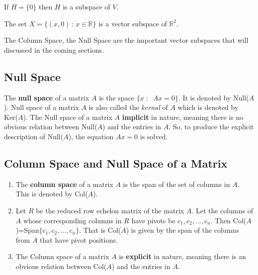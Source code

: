 \documentclass[aima104_lecturenotes_ku.tex]{subfiles}
\begin{document}
\begin{example}
  If $H = \{0\}$ then $H$ is a subspace of $V$.
\end{example}

\begin{example}
  The set $X=\{(x, 0)\, : \, x \in \mathbb{R} \}$ is a vector subspace of $\mathbb{R}^2$.
\end{example}
\begin{example}
  The Column Space, the Null Space are the important vector subspaces that will discussed in the coming sections.
\end{example}

\subsection{Null Space}
The \textbf{null space} of a matrix $A$ is the space $\{x\; : \;\; Ax=0\}$. It is denoted by Null($A$). Null space of a matrix $A$ is also called the \textit{kernal} of $A$ which is denoted by Ker($A$). The Null space of a matrix $A$ \textbf{implicit} in nature, meaning there is no obvious relation between Null($A$) and the entries in $A$. So, to produce the explicit description of Null($A$), the equation $Ax=0$ is solved.

\subsection{Column Space and Null Space of a Matrix}
\begin{enumerate}
\item The \textbf{column space} of a matrix $A$ is the span of the set of columns in $A$. This is denoted by Col($A$).

\item Let $R$ be the reduced row echelon matrix of the matrix $A$. Let the columns of $A$ whose corresponding columns in $R$ have pivots be $c_1, c_2,...,c_n$. Then Col($A$)=Span$\{c_1, c_2,...,c_n\}$. That is Col($A$) is given by the span of the columns from $A$ that have pivot positions.

\item The Column space of a matrix $A$ is \textbf{explicit} in nature, meaning there is an obvious relation between Col($A$) and the entries in $A$.
\end{enumerate}
\end{document}

